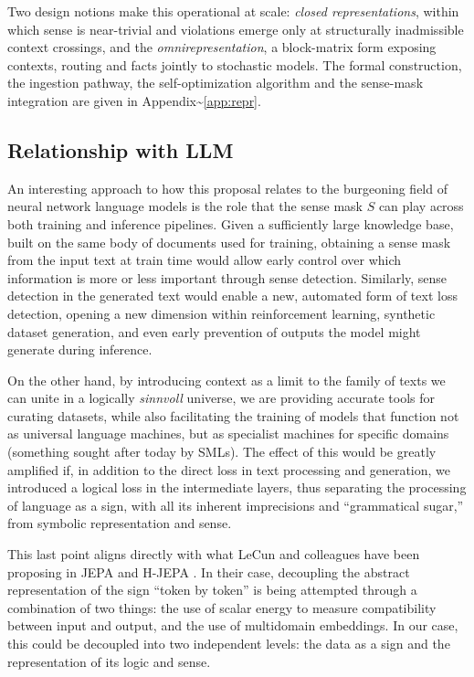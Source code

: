 \documentclass{article}
\begin{document}
Two design notions make this operational at scale: \emph{closed
representations}, within which sense is near-trivial and violations
emerge only at structurally inadmissible context crossings, and the
\emph{omnirepresentation}, a block-matrix form exposing contexts,
routing and facts jointly to stochastic models. The formal construction,
the ingestion pathway, the self-optimization algorithm and the
sense-mask integration are given in
Appendix\textasciitilde{}\ref{app:repr}.

\hypertarget{relationship-with-llm}{%
\subsection{Relationship with LLM}\label{relationship-with-llm}}

An interesting approach to how this proposal relates to the burgeoning
field of neural network language models is the role that the sense mask
\(S\) can play across both training and inference pipelines. Given a
sufficiently large knowledge base, built on the same body of documents
used for training, obtaining a sense mask from the input text at train
time would allow early control over which information is more or less
important through sense detection. Similarly, sense detection in the
generated text would enable a new, automated form of text loss
detection, opening a new dimension within reinforcement learning,
synthetic dataset generation, and even early prevention of outputs the
model might generate during inference.

On the other hand, by introducing context as a limit to the family of
texts we can unite in a logically \emph{sinnvoll} universe, we are
providing accurate tools for curating datasets, while also facilitating
the training of models that function not as universal language machines,
but as specialist machines for specific domains (something sought after
today by SMLs). The effect of this would be greatly amplified if, in
addition to the direct loss in text processing and generation, we
introduced a logical loss in the intermediate layers, thus separating
the processing of language as a sign, with all its inherent imprecisions
and ``grammatical sugar,'' from symbolic representation and sense.

This last point aligns directly with what LeCun and colleagues have been
proposing in JEPA and H-JEPA
\citep{lecun2022path, dawid2024latent, assran2023ijepa}. In their case,
decoupling the abstract representation of the sign ``token by token'' is
being attempted through a combination of two things: the use of scalar
energy to measure compatibility between input and output, and the use of
multidomain embeddings. In our case, this could be decoupled into two
independent levels: the data as a sign and the representation of its
logic and sense.
\end{document}
